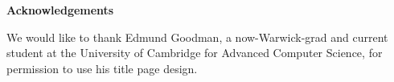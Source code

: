 \vspace*{\fill}
\thispagestyle{empty}
\begin{center}
    \textbf{Acknowledgements}
\end{center}
We would like to thank Edmund Goodman, a now-Warwick-grad and current student at the University of Cambridge for Advanced Computer Science, for permission to use his title page design.
\vspace*{\fill}